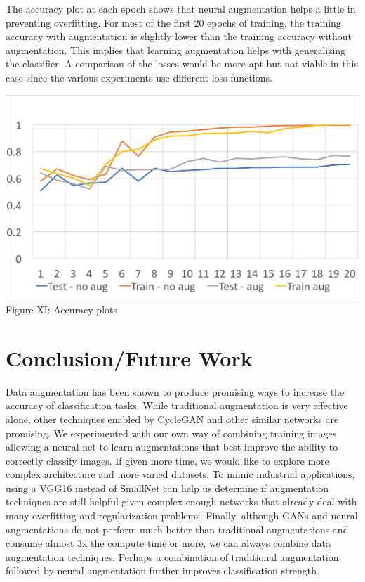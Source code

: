 \documentclass[10pt,twocolumn,letterpaper]{article}
\begin{document}
The accuracy plot at each epoch shows that neural augmentation helps a little in preventing overfitting. For most of the first 20 epochs of training, the training accuracy with augmentation is slightly lower than the training accuracy without augmentation. This implies that learning augmentation helps with generalizing the classifier. A comparison of the losses would be more apt but not viable in this case since the various experiments use different loss functions. 

\begin{center}
\includegraphics[scale=0.33]{loss1}
Figure XI: Accuracy plots
\end{center}


\section{Conclusion/Future Work}

Data augmentation has been shown to produce promising ways to increase the accuracy of classification tasks. While traditional augmentation is very effective alone, other techniques enabled by CycleGAN and other similar networks are promising. We experimented with our own way of combining training images allowing a neural net to learn augmentations that best improve the ability to correctly classify images. If given more time, we would like to explore more complex architecture and more varied datasets. To mimic industrial applications, using a VGG16 instead of SmallNet can help us determine if augmentation techniques are still helpful given complex enough networks that already deal with many overfitting and regularization problems. Finally, although GANs and neural augmentations do not perform much better than traditional augmentations and consume almost 3x the compute time or more, we can always combine data augmentation techniques. Perhaps a combination of traditional augmentation followed by neural augmentation further improves classification strength.  \\
\end{document}

